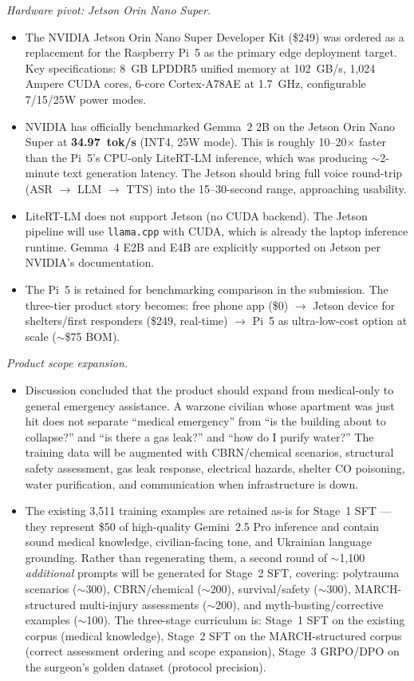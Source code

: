 \documentclass{article}
\theoremstyle{plain}
\theoremstyle{definition}
\theoremstyle{remark}
\begin{document}
\textit{Hardware pivot: Jetson Orin Nano Super.}
\begin{itemize}
\item The NVIDIA Jetson Orin Nano Super Developer Kit (\$249) was ordered as a replacement for the Raspberry Pi~5 as the primary edge deployment target. Key specifications: 8~GB LPDDR5 unified memory at 102~GB/s, 1{,}024 Ampere CUDA cores, 6-core Cortex-A78AE at 1.7~GHz, configurable 7/15/25W power modes.
\item NVIDIA has officially benchmarked Gemma~2 2B on the Jetson Orin Nano Super at \textbf{34.97~tok/s} (INT4, 25W mode). This is roughly 10--20$\times$ faster than the Pi~5's CPU-only LiteRT-LM inference, which was producing $\sim$2-minute text generation latency. The Jetson should bring full voice round-trip (ASR $\rightarrow$ LLM $\rightarrow$ TTS) into the 15--30-second range, approaching usability.
\item LiteRT-LM does not support Jetson (no CUDA backend). The Jetson pipeline will use \texttt{llama.cpp} with CUDA, which is already the laptop inference runtime. Gemma~4 E2B and E4B are explicitly supported on Jetson per NVIDIA's documentation.
\item The Pi~5 is retained for benchmarking comparison in the submission. The three-tier product story becomes: free phone app (\$0) $\rightarrow$ Jetson device for shelters/first responders (\$249, real-time) $\rightarrow$ Pi~5 as ultra-low-cost option at scale ($\sim$\$75 BOM).
\end{itemize}

\textit{Product scope expansion.}
\begin{itemize}
\item Discussion concluded that the product should expand from medical-only to general emergency assistance. A warzone civilian whose apartment was just hit does not separate ``medical emergency'' from ``is the building about to collapse?'' and ``is there a gas leak?'' and ``how do I purify water?'' The training data will be augmented with CBRN/chemical scenarios, structural safety assessment, gas leak response, electrical hazards, shelter CO poisoning, water purification, and communication when infrastructure is down.
\item The existing 3{,}511 training examples are retained as-is for Stage~1 SFT --- they represent \$50 of high-quality Gemini~2.5 Pro inference and contain sound medical knowledge, civilian-facing tone, and Ukrainian language grounding. Rather than regenerating them, a second round of $\sim$1{,}100 \emph{additional} prompts will be generated for Stage~2 SFT, covering: polytrauma scenarios ($\sim$300), CBRN/chemical ($\sim$200), survival/safety ($\sim$300), MARCH-structured multi-injury assessments ($\sim$200), and myth-busting/corrective examples ($\sim$100). The three-stage curriculum is: Stage~1 SFT on the existing corpus (medical knowledge), Stage~2 SFT on the MARCH-structured corpus (correct assessment ordering and scope expansion), Stage~3 GRPO/DPO on the surgeon's golden dataset (protocol precision).
\end{itemize}
\end{document}
